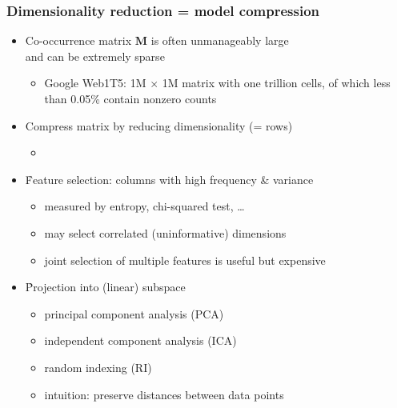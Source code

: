 \begin{frame}
  \frametitle{Dimensionality reduction = model compression}

  \begin{itemize}
  \item Co-occurrence matrix $\mathbf{M}$ is often unmanageably large\\
    and can be extremely sparse
    \begin{itemize}
    \item Google Web1T5: 1M $\times$ 1M matrix with one trillion
      cells, of which less than 0.05\% contain nonzero counts \citep{Evert:10a}
    \end{itemize}
  \item[\So] Compress matrix by reducing dimensionality (= rows)
    \begin{itemize}
    \item[]\pause
    \end{itemize}
  \item \h{Feature selection}: columns with high frequency \& variance
    \begin{itemize}
    \item measured by entropy, chi-squared test, \ldots
    \item may select correlated (\so uninformative) dimensions
    \item joint selection of multiple features is useful but expensive
    \end{itemize}
    \pause
  \item \h{Projection} into (linear) subspace
    \begin{itemize}
    \item principal component analysis (PCA)
    \item independent component analysis (ICA)
    \item random indexing (RI)
    \item[\hand] intuition: preserve distances between data points
    \end{itemize}
  \end{itemize}
\end{frame}

